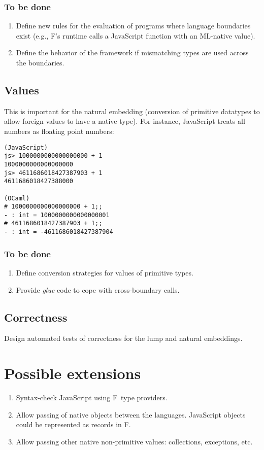\documentclass[12pt,a4paper, twoside]{article}
\newcommand{\fs}{F\nolinebreak\hspace{-.05em}\raisebox{.6ex}{\tiny\bf
    \#}}
\begin{document}
\subsubsection*{To be done}
\begin{enumerate}

\item Define new rules for the evaluation of programs where language
boundaries exist (e.g., \fs's runtime calls a JavaScript function
with an ML-native value).

\item Define the behavior of the framework if mismatching types are
used across the boundaries.
\end{enumerate}


\subsection{Values}

This is important for the natural embedding (conversion of primitive
datatypes to allow foreign values to have a native type). For instance,
JavaScript treats all numbers as floating point numbers:

\begin{verbatim}
(JavaScript)
js> 1000000000000000000 + 1
1000000000000000000
js> 4611686018427387903 + 1
4611686018427388000
--------------------
(OCaml)
# 1000000000000000000 + 1;;
- : int = 1000000000000000001
# 4611686018427387903 + 1;;
- : int = -4611686018427387904
\end{verbatim}

\subsubsection*{To be done}

\begin{enumerate}
\item Define conversion strategies for values of primitive types.
\item Provide \emph{glue} code to cope with cross-boundary calls.
\end{enumerate}

\subsection{Correctness}
Design automated tests of correctness for the lump and natural
embeddings.

\section{Possible extensions}
\begin{enumerate}

\item Syntax-check JavaScript using \fs\ type providers.
\item Allow passing of native objects between the languages. JavaScript
objects could be represented as records in \fs.
\item Allow passing other native non-primitive values: collections,
exceptions, etc.
\end{enumerate}
\end{document}
